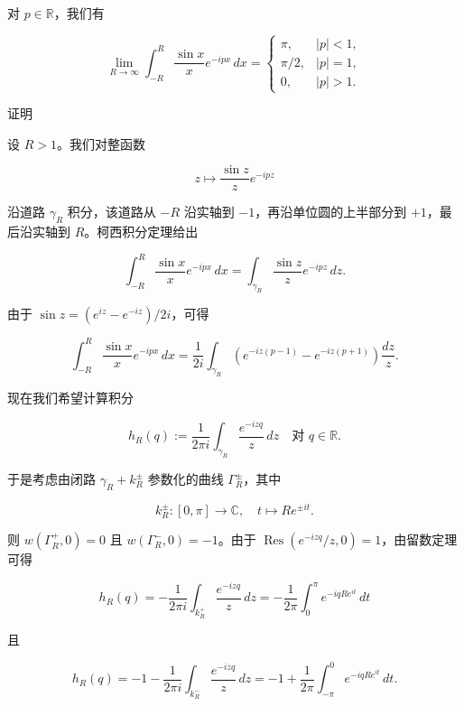 \begin{proposition}

对 $ p \in \mathbb{R} $，我们有

\begin{equation*}
\lim_{R\to\infty}\int_{-R}^{R}\frac{\sin x}{x}e^{-ipx}\,dx = \begin{cases} \pi , & |p| < 1 , \\ \pi/2 , & |p| = 1 , \\ 0 , & |p| > 1 . \end{cases}
\end{equation*}

证明

\begin{subitems}
\item

设 $ R > 1 $。我们对整函数

\[
z \mapsto \frac{\sin z}{z}e^{-ipz}
\]

沿道路 $ \gamma_{R} $ 积分，该道路从 $ -R $ 沿实轴到 $ -1 $，再沿单位圆的上半部分到 $ +1 $，最后沿实轴到 $ R $。柯西积分定理给出

\[
\int_{-R}^{R}\frac{\sin x}{x}e^{-ipx}\,dx = \int_{\gamma_{R}}\frac{\sin z}{z}e^{-ipz}\,dz .
\]

由于 $ \sin z = (e^{iz} - e^{-iz})/2i $，可得

\[
\int_{-R}^{R}\frac{\sin x}{x}e^{-ipx}\,dx = \frac{1}{2i}\int_{\gamma_{R}}\left(e^{-iz(p-1)} - e^{-iz(p+1)}\right)\frac{dz}{z} .
\]
\item

现在我们希望计算积分

\[
h_{R}(q) := \frac{1}{2\pi i}\int_{\gamma_{R}}\frac{e^{-izq}}{z}\,dz \quad \text{对 } q \in \mathbb{R} .
\]

于是考虑由闭路 $ \gamma_{R} + k_{R}^{\pm} $ 参数化的曲线 $ \Gamma_{R}^{\pm} $，其中

\[
k_{R}^{\pm} : [0,\pi] \to \mathbb{C} , \quad t \mapsto Re^{\pm it} .
\]
\end{subitems}


则 $ w(\Gamma_{R}^{+},0) = 0 $ 且 $ w(\Gamma_{R}^{-},0) = -1 $。由于 $ \operatorname{Res}(e^{-izq}/z,0) = 1 $，由留数定理可得

\[
h_{R}(q) = -\frac{1}{2\pi i}\int_{k_{R}^{+}}\frac{e^{-izq}}{z}\,dz = -\frac{1}{2\pi}\int_{0}^{\pi}e^{-iqRe^{it}}\,dt
\]

且

\[
h_{R}(q) = -1 - \frac{1}{2\pi i}\int_{k_{R}^{-}}\frac{e^{-izq}}{z}\,dz = -1 + \frac{1}{2\pi}\int_{-\pi}^{0}e^{-iqRe^{it}}\,dt .
\]


\end{proposition}

